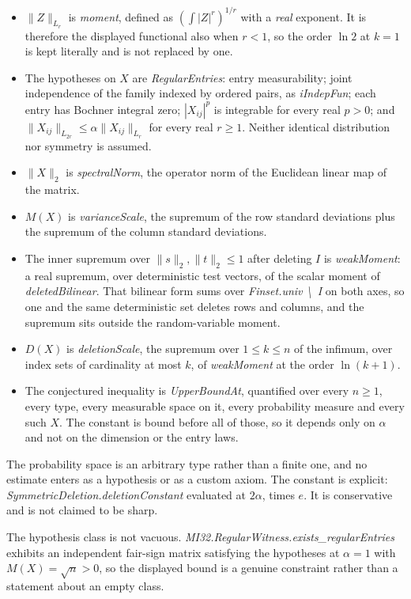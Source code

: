 \documentclass[11pt,a4paper]{article}
\providecommand{\tightlist}{\setlength{\itemsep}{0pt}\setlength{\parskip}{0pt}}
\begin{document}
\begin{itemize}
\tightlist
\item
  \(\|Z\|_{L_r}\) is \textit{moment}, defined as \((\int|Z|^r)^{1/r}\)
  with a \emph{real} exponent. It is therefore the displayed functional
  also when \(r<1\), so the order \(\ln2\) at \(k=1\) is kept literally
  and is not replaced by one.
\item
  The hypotheses on \(X\) are \textit{RegularEntries}: entry
  measurability; joint independence of the family indexed by ordered
  pairs, as \textit{iIndepFun}; each entry has Bochner integral zero;
  \(|X_{ij}|^p\) is integrable for every real \(p>0\); and
  \(\|X_{ij}\|_{L_{2r}}\le\alpha\|X_{ij}\|_{L_r}\) for every real
  \(r\ge1\). Neither identical distribution nor symmetry is assumed.
\item
  \(\|X\|_2\) is \textit{spectralNorm}, the operator norm of the
  Euclidean linear map of the matrix.
\item
  \(M(X)\) is \textit{varianceScale}, the supremum of the row standard
  deviations plus the supremum of the column standard deviations.
\item
  The inner supremum over \(\|s\|_2,\|t\|_2\le1\) after deleting \(I\)
  is \textit{weakMoment}: a real supremum, over deterministic test
  vectors, of the scalar moment of \textit{deletedBilinear}. That
  bilinear form sums over \textit{Finset.univ \textbackslash{}\ I} on
  both axes, so one and the same deterministic set deletes rows and
  columns, and the supremum sits outside the random-variable moment.
\item
  \(D(X)\) is \textit{deletionScale}, the supremum over \(1\le k\le n\)
  of the infimum, over index sets of cardinality at most \(k\), of
  \textit{weakMoment} at the order \(\ln(k+1)\).
\item
  The conjectured inequality is \textit{UpperBoundAt}, quantified over
  every \(n\ge1\), every type, every measurable space on it, every
  probability measure and every such \(X\). The constant is bound before
  all of those, so it depends only on \(\alpha\) and not on the
  dimension or the entry laws.
\end{itemize}

The probability space is an arbitrary type rather than a finite one, and
no estimate enters as a hypothesis or as a custom axiom. The constant is
explicit: \textit{SymmetricDeletion.deletionConstant} evaluated at
\(2\alpha\), times \(e\). It is conservative and is not claimed to be
sharp.

The hypothesis class is not vacuous.
\textit{MI32.RegularWitness.exists\_regularEntries} exhibits an
independent fair-sign matrix satisfying the hypotheses at \(\alpha=1\)
with \(M(X)=\sqrt n>0\), so the displayed bound is a genuine constraint
rather than a statement about an empty class.
\end{document}
